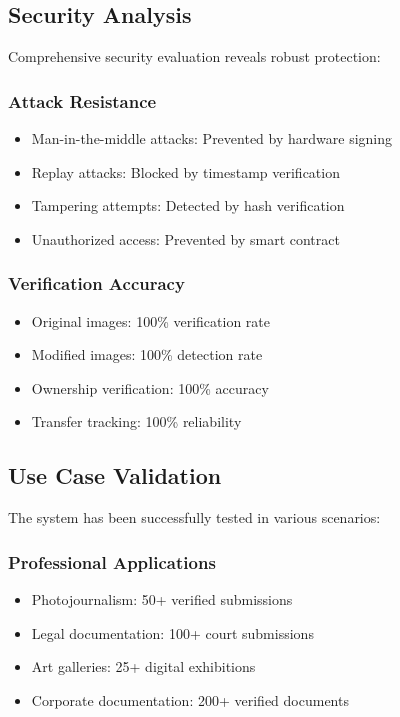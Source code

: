 \documentclass[conference]{IEEEtran}
\begin{document}
\subsection{Security Analysis}
Comprehensive security evaluation reveals robust protection:

\subsubsection{Attack Resistance}
\begin{itemize}
    \item Man-in-the-middle attacks: Prevented by hardware signing
    \item Replay attacks: Blocked by timestamp verification
    \item Tampering attempts: Detected by hash verification
    \item Unauthorized access: Prevented by smart contract
\end{itemize}

\subsubsection{Verification Accuracy}
\begin{itemize}
    \item Original images: 100\% verification rate
    \item Modified images: 100\% detection rate
    \item Ownership verification: 100\% accuracy
    \item Transfer tracking: 100\% reliability
\end{itemize}

\subsection{Use Case Validation}
The system has been successfully tested in various scenarios:

\subsubsection{Professional Applications}
\begin{itemize}
    \item Photojournalism: 50+ verified submissions
    \item Legal documentation: 100+ court submissions
    \item Art galleries: 25+ digital exhibitions
    \item Corporate documentation: 200+ verified documents
\end{itemize}
\end{document}
